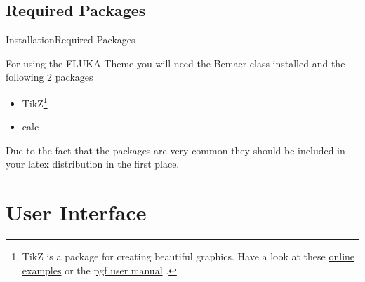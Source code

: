 \documentclass[10pt]{beamer}
\newcommand{\chref}[2]{
  \href{#1}{{\usebeamercolor[bg]{FLUKA}#2}}
}
\begin{document}
\subsection{Required Packages}
\begin{frame}{Installation}{Required Packages}

  For using the FLUKA Theme you will need the Bemaer class installed and the following 2 packages
  \begin{itemize}
    \item TikZ\footnote{TikZ is a package for creating beautiful graphics. Have a look at these \chref{http://www.texample.net/tikz/examples/}{online examples} or the \chref{http://tug.ctan.org/tex-archive/graphics/pgf/base/doc/generic/pgf/pgfmanual.pdf}{pgf user manual}.}
    \item calc
  \end{itemize}
  Due to the fact that the packages are very common they should be included in your latex distribution in the first place.
\end{frame}

\section{User Interface}
\end{document}
